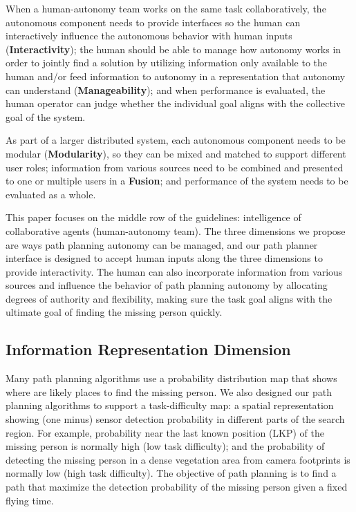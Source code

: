 When a human-autonomy team works on the same task collaboratively, the autonomous component needs to provide interfaces so the human can interactively influence the autonomous behavior with human inputs (\textbf{Interactivity}); the human should be able to manage how autonomy works in order to jointly find a solution by utilizing information only available to the human and/or feed information to autonomy in a representation that autonomy can understand (\textbf{Manageability}); and when performance is evaluated, the human operator can judge whether the individual goal aligns with the collective goal of the system. 

As part of a larger distributed system, each autonomous component needs to be modular (\textbf{Modularity}), so they can be mixed and matched to support different user roles; information from various sources need to be combined and presented to one or multiple users in a \textbf{Fusion}; and performance of the system needs to be evaluated as a whole. 

This paper focuses on the middle row of the guidelines: intelligence of collaborative agents (human-autonomy team). The three dimensions we propose are ways path planning autonomy can be managed, and our path planner interface is designed to accept human inputs along the three dimensions to provide interactivity. The human can also incorporate information from various sources and influence the behavior of path planning autonomy by allocating degrees of authority and flexibility, making sure the task goal aligns with the ultimate goal of finding the missing person quickly.

\subsection{Information Representation Dimension}

Many path planning algorithms use a probability distribution map that shows where are likely places to find the missing person. We also designed our path planning algorithms to support a task-difficulty map: a spatial representation showing (one minus) sensor detection probability in different parts of the search region. For example, probability near the last known position (LKP) of the missing person is normally high (low task difficulty); and the probability of detecting the missing person in a dense vegetation area from camera footprints is normally low (high task difficulty). The objective of path planning is to find a path that maximize the detection probability of the missing person given a fixed flying time. 

